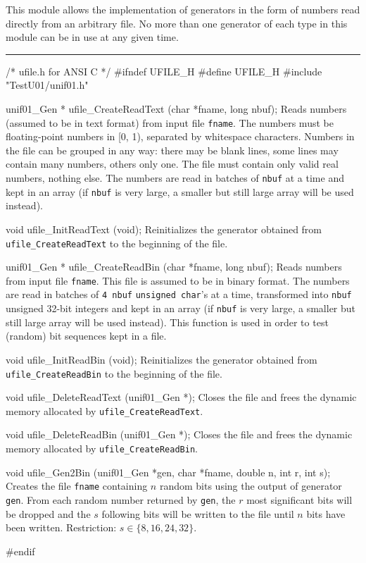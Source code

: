 
This module allows the implementation of generators in the form of numbers
read directly from an arbitrary file. No more than one generator of each
 type in this module can be in use at any given time.


\bigskip
\hrule
\code\hide
/* ufile.h for ANSI C */
#ifndef UFILE_H
#define UFILE_H
\endhide
#include "TestU01/unif01.h"


unif01_Gen * ufile_CreateReadText (char *fname, long nbuf);
\endcode
  \tab  Reads numbers (assumed to be in text format) from input file
   \texttt{fname}. %
   The numbers must be floating-point numbers in [0, 1), separated by
   whitespace characters. Numbers in the file can be grouped in any way: 
   there may be blank lines, some lines may contain many numbers, others
   only one. The file must contain only valid real numbers, nothing else.
   The numbers are read in batches of {\tt nbuf} at a time and kept in an array
   (if {\tt nbuf} is very large, a smaller but still large array will be used
   instead).
 \endtab
\code


void ufile_InitReadText (void);
\endcode
  \tab Reinitializes the generator obtained from {\tt ufile\_CreateReadText}
   to the beginning of the file.
  \endtab
\code


unif01_Gen * ufile_CreateReadBin (char *fname, long nbuf);
\endcode
  \tab  Reads numbers from input file \texttt{fname}. This file is assumed
   to be in binary format. The numbers are read in batches of {\tt 4 nbuf}
  \texttt{unsigned char}'s at a time, transformed into  {\tt nbuf}  unsigned
   32-bit integers and kept in an array (if {\tt nbuf} is very large, a
    smaller but still large array will be used instead).
   This function is used in order to test (random) 
   bit sequences kept in a file.
  \endtab
\code


void ufile_InitReadBin (void);
\endcode
  \tab Reinitializes the generator obtained from {\tt ufile\_CreateReadBin}
   to the beginning of the file.
  \endtab


\code

void ufile_DeleteReadText (unif01_Gen *);
\endcode
  \tab Closes the file and frees the dynamic memory allocated by 
  \texttt{ufile\_CreateReadText}.
  \endtab
\code


void ufile_DeleteReadBin (unif01_Gen *);
\endcode
  \tab Closes the file and frees the dynamic memory allocated by 
  \texttt{ufile\_CreateReadBin}.
  \endtab


\code

void ufile_Gen2Bin (unif01_Gen *gen, char *fname, double n, int r, int s);
\endcode
  \tab Creates the file {\tt fname} containing $n$ random bits using the
  output of generator {\tt gen}. From each random number 
  returned by {\tt gen}, the $r$ most significant bits will be dropped
  and the $s$ following bits will be written to the file until $n$ bits
  have been written. Restriction: $s \in \{ 8, 16, 24, 32 \}$. 
  \endtab

\code
\hide
#endif
\endhide
\endcode
